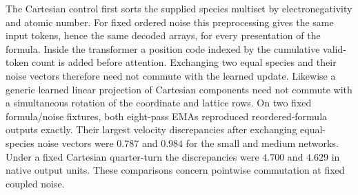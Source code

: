 The Cartesian control first sorts the supplied species multiset by electronegativity
and atomic number. For fixed ordered noise this preprocessing gives the same input
tokens, hence the same decoded arrays, for every presentation of the formula.
Inside the transformer a position code indexed by the cumulative valid-token count
is added before attention. Exchanging two equal species and their noise vectors
therefore need not commute with the learned update. Likewise a generic learned
linear projection of Cartesian components need not commute with a simultaneous
rotation of the coordinate and lattice rows. On two fixed formula/noise fixtures,
both eight-pass EMAs reproduced reordered-formula outputs exactly. Their largest
velocity discrepancies after exchanging equal-species noise vectors were $0.787$
and $0.984$ for the small and medium networks. Under a fixed Cartesian quarter-turn
the discrepancies were $4.700$ and $4.629$ in native output units. These comparisons
concern pointwise commutation at fixed coupled noise.
